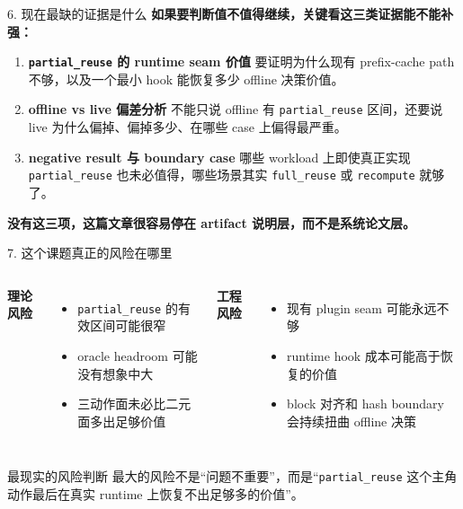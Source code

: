 \documentclass[10pt,aspectratio=169]{ctexbeamer}
\begin{document}
\begin{frame}{6. 现在最缺的证据是什么}
\textbf{如果要判断值不值得继续，关键看这三类证据能不能补强：}

\vspace{0.3em}
\begin{enumerate}
  \item \textbf{\texttt{partial\_reuse} 的 runtime seam 价值}
  要证明为什么现有 prefix-cache path 不够，以及一个最小 hook 能恢复多少 offline 决策价值。

  \item \textbf{offline vs live 偏差分析}
  不能只说 offline 有 \texttt{partial\_reuse} 区间，还要说 live 为什么偏掉、偏掉多少、在哪些 case 上偏得最严重。

  \item \textbf{negative result 与 boundary case}
  哪些 workload 上即使真正实现 \texttt{partial\_reuse} 也未必值得，哪些场景其实 \texttt{full\_reuse} 或 \texttt{recompute} 就够了。
\end{enumerate}

\vspace{0.4em}
\textbf{没有这三项，这篇文章很容易停在 artifact 说明层，而不是系统论文层。}
\end{frame}

\begin{frame}{7. 这个课题真正的风险在哪里}
\begin{columns}[T]
\textbf{理论风险}
\begin{itemize}
  \item \texttt{partial\_reuse} 的有效区间可能很窄
  \item oracle headroom 可能没有想象中大
  \item 三动作面未必比二元面多出足够价值
\end{itemize}

\textbf{工程风险}
\begin{itemize}
  \item 现有 plugin seam 可能永远不够
  \item runtime hook 成本可能高于恢复的价值
  \item block 对齐和 hash boundary 会持续扭曲 offline 决策
\end{itemize}
\end{columns}

\vspace{0.5em}
\begin{block}{最现实的风险判断}
最大的风险不是“问题不重要”，而是“\texttt{partial\_reuse} 这个主角动作最后在真实 runtime 上恢复不出足够多的价值”。
\end{block}
\end{frame}
\end{document}
